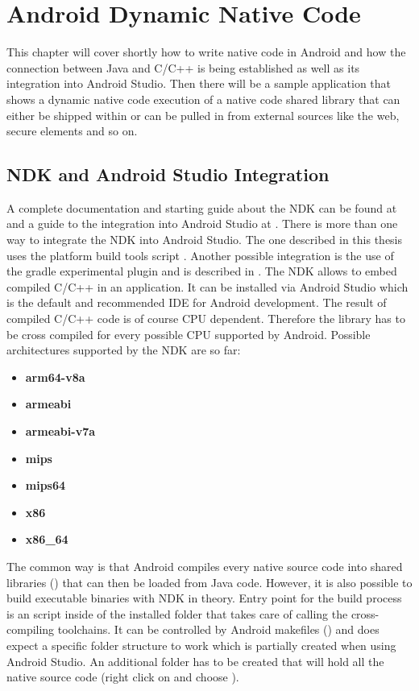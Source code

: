 \chapter{Android Dynamic Native Code}\label{chapter:android_dynamic_native_code}

This chapter will cover shortly how to write native code in Android and how
the connection between Java and C/C++ is being established as well as its
integration into Android Studio.
Then there will be a sample application that shows a dynamic native code execution of a native code shared library that can either be shipped within  or can be pulled in from external sources like the web, secure elements and so on.

\section{NDK and Android Studio Integration}\label{section:ndk_integration}
A complete documentation and starting guide about the NDK can be found at \parencite{ndk} and a guide to the integration into Android Studio at \parencite{ndk_integration}.
There is more than one way to integrate the NDK into Android Studio. The one described
in this thesis uses the platform build tools script . Another possible
integration is the use of the gradle experimental plugin and is described in \parencite{gradle_experimental}.
The NDK allows to embed compiled C/C++ in an application. It can be installed via Android Studio which is the default and recommended IDE for Android development.
The result of compiled C/C++ code is of course CPU dependent. Therefore the library has to be cross compiled for
every possible CPU supported by Android. Possible architectures supported by the NDK are so far:
\begin{itemize}
\item \textbf{arm64-v8a}
\item \textbf{armeabi}
\item \textbf{armeabi-v7a}
\item \textbf{mips}
\item \textbf{mips64}
\item \textbf{x86}
\item \textbf{x86\_64}
\end{itemize}
The common way is that Android compiles every native source code into shared libraries
() that can then be loaded from Java code. However, it is also possible to build executable binaries with NDK in theory. Entry point for the build process is an  script inside of the installed  folder that takes care of calling the cross-compiling toolchains. It can be controlled by Android makefiles () and does
expect a specific folder structure to work which is partially created when using Android Studio. An additional  folder has to be created that will hold all the native source code (right click on  and choose ).

